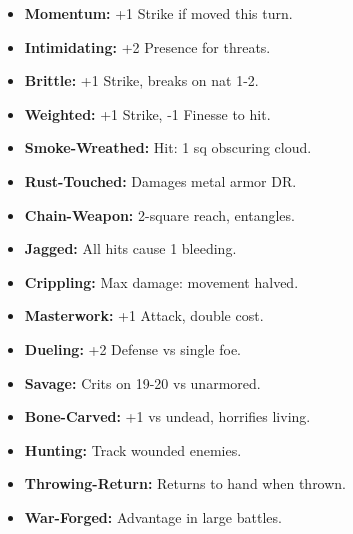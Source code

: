 \documentclass[10pt,twoside]{article}
\begin{document}
\hfill
\begin{minipage}[t]{0.48\textwidth}
\begin{itemize}[leftmargin=0.3cm, itemsep=0.1cm]
\item \textcolor{uncommoncolor}{\textbf{Momentum:}} \textcolor{uncommoncolor}{+1 Strike if moved this turn.}
\item \textcolor{uncommoncolor}{\textbf{Intimidating:}} \textcolor{uncommoncolor}{+2 Presence for threats.}
\item \textcolor{uncommoncolor}{\textbf{Brittle:}} \textcolor{uncommoncolor}{+1 Strike, breaks on nat 1-2.}
\item \textcolor{uncommoncolor}{\textbf{Weighted:}} \textcolor{uncommoncolor}{+1 Strike, -1 Finesse to hit.}
\item \textcolor{uncommoncolor}{\textbf{Smoke-Wreathed:}} \textcolor{uncommoncolor}{Hit: 1 sq obscuring cloud.}
\item \textcolor{uncommoncolor}{\textbf{Rust-Touched:}} \textcolor{uncommoncolor}{Damages metal armor DR.}
\item \textcolor{uncommoncolor}{\textbf{Chain-Weapon:}} \textcolor{uncommoncolor}{2-square reach, entangles.}
\item \textcolor{uncommoncolor}{\textbf{Jagged:}} \textcolor{uncommoncolor}{All hits cause 1 bleeding.}
\item \textcolor{uncommoncolor}{\textbf{Crippling:}} \textcolor{uncommoncolor}{Max damage: movement halved.}
\item \textcolor{uncommoncolor}{\textbf{Masterwork:}} \textcolor{uncommoncolor}{+1 Attack, double cost.}
\item \textcolor{uncommoncolor}{\textbf{Dueling:}} \textcolor{uncommoncolor}{+2 Defense vs single foe.}
\item \textcolor{uncommoncolor}{\textbf{Savage:}} \textcolor{uncommoncolor}{Crits on 19-20 vs unarmored.}
\item \textcolor{uncommoncolor}{\textbf{Bone-Carved:}} \textcolor{uncommoncolor}{+1 vs undead, horrifies living.}
\item \textcolor{uncommoncolor}{\textbf{Hunting:}} \textcolor{uncommoncolor}{Track wounded enemies.}
\item \textcolor{uncommoncolor}{\textbf{Throwing-Return:}} \textcolor{uncommoncolor}{Returns to hand when thrown.}
\item \textcolor{uncommoncolor}{\textbf{War-Forged:}} \textcolor{uncommoncolor}{Advantage in large battles.}
\end{itemize}
\end{minipage}
\end{document}
